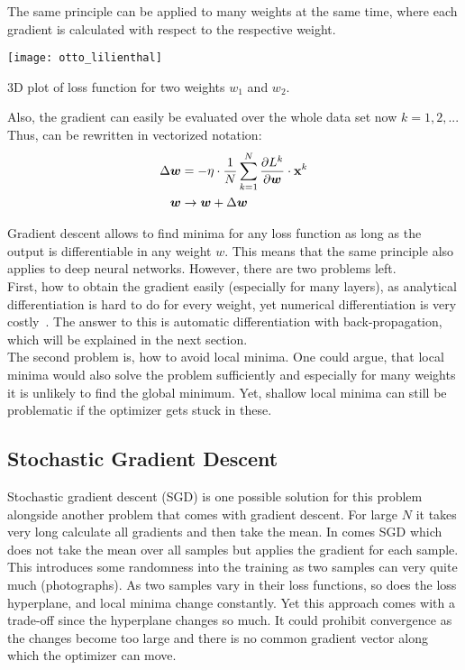 The same principle can be applied to many weights at the same time, where each gradient is calculated with respect to the respective weight.
\begin{marginfigure}
    \texttt{[image: otto\_lilienthal]}
    \caption[]{3D plot of loss function for two  weights $w_1$ and $w_2$.}
\end{marginfigure}
Also, the gradient can easily be evaluated over the whole data set now $k = 1, 2,...$
Thus,  can be rewritten in vectorized notation:
\begin{align}
    \Delta \boldsymbol{w} & = - \eta \cdot \frac{1}{N} \sum_{k=1}^{N} \frac{\partial L^k}{\partial \boldsymbol{w}} \cdot \mathbf{x}^k \\
    \boldsymbol{w} & \rightarrow \boldsymbol{w} + \Delta \boldsymbol{w}
\end{align}

Gradient descent allows to find minima for any loss function as long as the output is differentiable in any weight $w$.
This means that the same principle also applies to deep neural networks.
However, there are two problems left.\\
First, how to obtain the gradient easily (especially for many layers), as analytical differentiation is hard to do for every weight, yet numerical differentiation is very costly~\cite{ommer}.
The answer to this is automatic differentiation with back-propagation, which will be explained in the next section.\\
The second problem is, how to avoid local minima.
One could argue, that local minima would also solve the problem sufficiently and especially for many weights it is unlikely to find the global minimum.
Yet, shallow local minima can still be problematic if the optimizer gets stuck in these.

\subsection{Stochastic Gradient Descent}
Stochastic gradient descent (SGD) is one possible solution for this problem alongside another problem that comes with gradient descent.
For large $N$ it takes very long calculate all gradients and then take the mean.
In comes SGD which does not take the mean over all samples but applies the gradient for each sample.\\
This introduces some randomness into the training as two samples can very quite much (\eg photographs).
As two samples vary in their loss functions, so does the loss hyperplane, and local minima change constantly.
Yet this approach comes with a trade-off since the hyperplane changes so much.
It could prohibit convergence as the changes become too large and there is no common gradient vector along which the optimizer can move.

